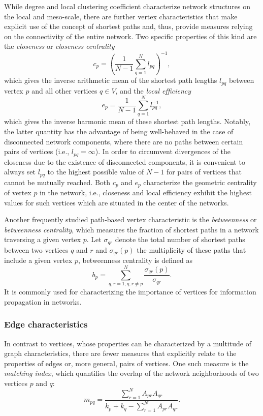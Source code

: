 		While degree and local clustering coefficient characterize network structures on the local and meso-scale, there are further vertex characteristics that make explicit use of the concept of shortest paths and, thus, provide measures relying on the connectivity of the entire network. Two specific properties of this kind are the \textit{closeness} or \textit{closeness centrality}
\begin{equation}
  {c}_p =\left(\frac{1}{N-1}\sum_{q=1}^N   {l}_{pq}  \right)^{-1},
\label{eq:closeness}
\end{equation}
\noindent
which gives the inverse arithmetic mean of the shortest path lengths $l_{pq}$ between vertex $p$ and all other vertices $q\in V$, and the \textit{local efficiency}
\begin{equation}
  {e}_p =\frac{1}{N-1}\sum_{q=1}^N   {l}_{pq} ^{-1},
\label{eq:locefficiency}
\end{equation}
\noindent
which gives the inverse harmonic mean of these shortest path lengths. Notably, the latter quantity has the advantage of being well-behaved in the case of disconnected network components, where there are no paths between certain pairs of vertices (i.e., $  {l}_{pq}=\infty$). In order to circumvent divergences of the closeness due to the existence of disconnected components, it is convenient to always set ${l}_{pq}$ to the highest possible value of $N-1$ for pairs of vertices that cannot be mutually reached. Both $  {c}_p $ and $  {e}_p $ characterize the geometric centrality of vertex $p$ in the network, i.e., closeness and local efficiency exhibit the highest values for such vertices which are situated in the center of the networks. 

		Another frequently studied path-based vertex characteristic is the \textit{betweenness} or \textit{betweenness centrality}, which measures the fraction of shortest paths in a network traversing a given vertex $p$. Let $  {\sigma}_{qr}$ denote the total number of shortest paths between two vertices $q$ and $r$ and $  {\sigma}_{qr}(p)$ the multiplicity of these paths that include a given vertex $p$, betweenness centrality is defined as
\begin{equation}
  {b}_p =\sum_{q,r=1; q,r\neq p}^N \frac{  {\sigma}_{qr}(p)}{  {\sigma}_{qr}}.
\label{eq:betweenness}
\end{equation}
\noindent
It is commonly used for characterizing the importance of vertices for information propagation in networks. 

		\subsubsection{Edge characteristics}
		In contrast to vertices, whose properties can be characterized by a multitude of graph characteristics, there are fewer measures that explicitly relate to the properties of edges or, more general, pairs of vertices. One such measure is the \textit{matching index}, which quantifies the overlap of the network neighborhoods of two vertices $p$ and $q$:
\begin{equation}
  {m}_{pq} =\frac{\sum_{r=1}^N A_{pr}  A_{qr} }{  {k}_p +  {k}_q -\sum_{r=1}^N A_{pr}  A_{qr} }.
\label{eq:matching}
\end{equation}
\noindent

